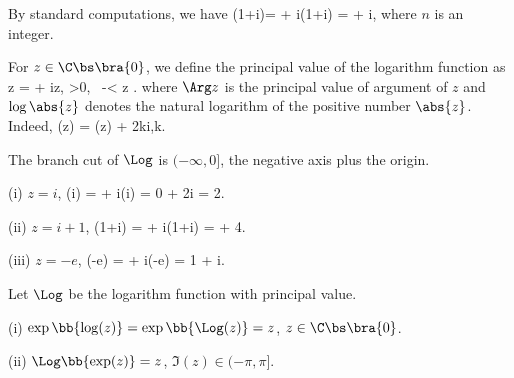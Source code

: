 \begin{example}
By standard computations, we have
\be
\log(1+i)= \log{} + i\arg(1+i) =   + i,
\ee
where $n$ is an integer.
\end{example}


\begin{definition}
For $z\in\C\bs\bra{0}$, we define the principal value of the logarithm function as
\be
\Log z = \log {} + i\Arg z, \quad {}>0, \ -\pi < \Arg z \leq \pi.
\ee
where $\Arg z$ is the principal value of argument of $z$ and $\log \abs{z}$ denotes the natural logarithm of the positive number $\abs{z}$. Indeed,
\be
\log(z) = \Log(z) + 2k\pi i,\qquad k\in \Z.
\ee

The branch cut of $\Log$ is $(-\infty,0]$, the negative axis plus the origin.
\end{definition}

\begin{example}
\ben
\item [(i)] $z=i$,
\be
\Log(i) = \log{} + i\Arg(i) = 0 + \frac {\pi}2i = 2.
\ee
\item [(ii)] $z = i+1$,
\be
\Log (1+i) = \log{} + i\Arg(1+i)  =   + 4.
\ee
\item [(iii)] $z = -e$,
\be
\Log (-e) = \log{} + i\Arg(-e) = 1 + \pi i.
\ee
\een
\end{example}

\begin{proposition}\label{pro:exp_logarithm_composition}
Let $\Log$ be the logarithm function with principal value.
\ben
\item [(i)] $\exp\bb{\log(z)} = \exp\bb{\Log(z)} = z$, $z\in \C\bs\bra{0}$.
\item [(ii)] $\Log\bb{\exp(z)} = z$, $\Im(z) \in (-\pi,\pi]$.
\een
\end{proposition}

